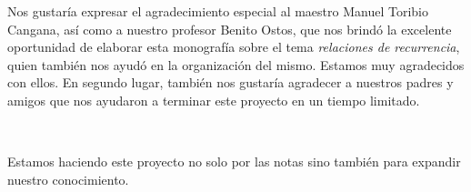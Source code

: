 Nos gustaría expresar el agradecimiento especial al maestro Manuel Toribio Cangana, así como a nuestro profesor Benito Ostos, que nos brindó la excelente oportunidad de elaborar esta monografía sobre el tema \emph{relaciones de recurrencia}, quien también nos ayudó en la organización del mismo. Estamos muy agradecidos con ellos. En segundo lugar, también nos gustaría agradecer a nuestros padres y amigos que nos ayudaron a terminar este proyecto en un tiempo limitado.\par

\

Estamos haciendo este proyecto no solo por las notas sino también para expandir nuestro conocimiento.